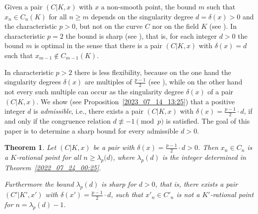 \documentclass[12pt,reqno]{amsart}%
\newtheorem{thm}[prop]{Theorem}
\theoremstyle{definition}
\theoremstyle{remark}
\newcommand{\de}{\delta}
\newcommand{\lam}{\lambda}
\begin{document}
Given a pair $(C|K,x)$ with $x$ a non-smooth point,
the bound $m$ such that $x_n \in C_n(K)$ for all $n\geq m$ depends on the singularity degree $d=\de(x)>0$ and the characteristic $p>0$, but not on the curve $C$ nor on the field $K$ (see \cite[Theorem~1.1]{HiSt22}).
In characteristic $p=2$ the bound is sharp (see \cite[Proposition~2.25]{HiSt22}), that is, for each integer $d>0$ the bound $m$ is optimal in the sense that there is a pair $(C|K,x)$ with $\de(x) = d$ such that $x_{m-1} \notin C_{m-1}(K)$.

In characteristic $p>2$ there is less flexibility, because on the one hand the singularity degrees $\de(x)$ are multiples of $\frac{p-1}2$ (see \cite[Proposition~2.5]{HiSt22}), while on the other hand
not every such multiple can occur as the singularity degree $\de(x)$ of a pair $(C|K,x)$.
We show (see Proposition~\ref{2023_07_14_13:25}) that a positive integer $d$ is \textit{admissible}, i.e., there exists a pair $(C|K,x)$ with $\de(x) = \frac{p-1}2 {\cdot} d$, %
if and only if the congruence relation $d \not \equiv -1 \pmod p$ is satisfied.
The goal of this paper is to determine a sharp bound for every admissible $d>0$.



\begin{thm}\label{2025_05_22_11:10}
Let $(C|K,x)$ be a pair with $\de(x) = \frac{p-1}2 {\cdot}d > 0$. 
Then $x_n \in C_n$ is a $K$-rational point for all $n \geq \lam_p \big( d \big)$, where $\lam_p(d)$ is the integer determined in Theorem~\ref{2022_07_24_00:25}.

Furthermore the bound $\lam_p(d)$ is sharp for $d>0$, that is, 
there exists a pair $(C'|K',x')$ with $\de(x') = \frac{p-1}2 {\cdot}d$,
such that $x'_n \in C'_n$ is not a $K'$-rational point for $n=\lam_p(d)-1$.
\end{thm}
\end{document}

